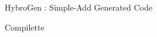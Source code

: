 \begin{Frame}{HybroGen : Simple-Add Generated Code}
    \begin{block}{Compilette}
      
    \end{block}

\end{Frame}
